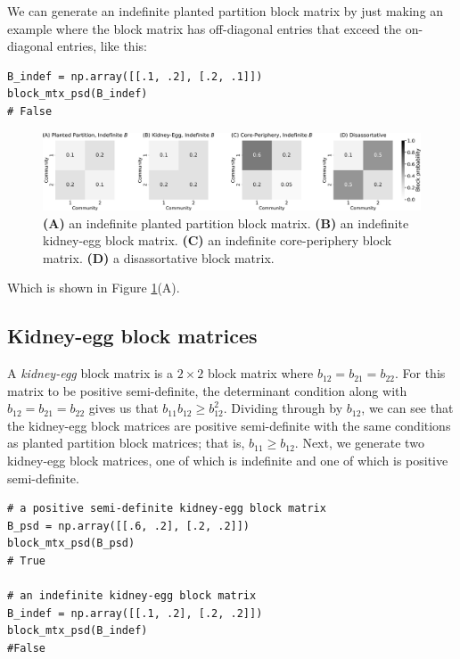We can generate an indefinite planted partition block matrix by just making an example where the block matrix has off-diagonal entries that exceed the on-diagonal entries, like this:


\begin{lstlisting}[style=python]
B_indef = np.array([[.1, .2], [.2, .1]])
block_mtx_psd(B_indef)
# False
\end{lstlisting}

\begin{figure}[h]
    \centering
    \includegraphics[width=\linewidth]{representations/ch5/Images/indef.png}
    \caption[Indefinite block matrices]{\textbf{(A)} an indefinite planted partition block matrix. \textbf{(B)} an indefinite kidney-egg block matrix. \textbf{(C)} an indefinite core-periphery block matrix. \textbf{(D)} a disassortative block matrix.}
    \label{fig:ch5:indef_bmtx}
\end{figure}

Which is shown in Figure \ref{fig:ch5:indef_bmtx}(A).

\subsection{Kidney-egg block matrices}

A \textit{kidney-egg} block matrix is a $2 \times 2$ block matrix where $b_{12} = b_{21} =  b_{22}$. For this matrix to be positive semi-definite, the determinant condition along with $b_{12} = b_{21} = b_{22}$ gives us that $b_{11}b_{12} \geq b_{12}^2$. Dividing through by $b_{12}$, we can see that the kidney-egg block matrices are positive semi-definite with the same conditions as planted partition block matrices; that is, $b_{11} \geq b_{12}$. Next, we generate two kidney-egg block matrices, one of which is indefinite and one of which is positive semi-definite. 

\begin{lstlisting}[style=python]
# a positive semi-definite kidney-egg block matrix
B_psd = np.array([[.6, .2], [.2, .2]])
block_mtx_psd(B_psd)
# True

# an indefinite kidney-egg block matrix
B_indef = np.array([[.1, .2], [.2, .2]])
block_mtx_psd(B_indef)
#False
\end{lstlisting}

